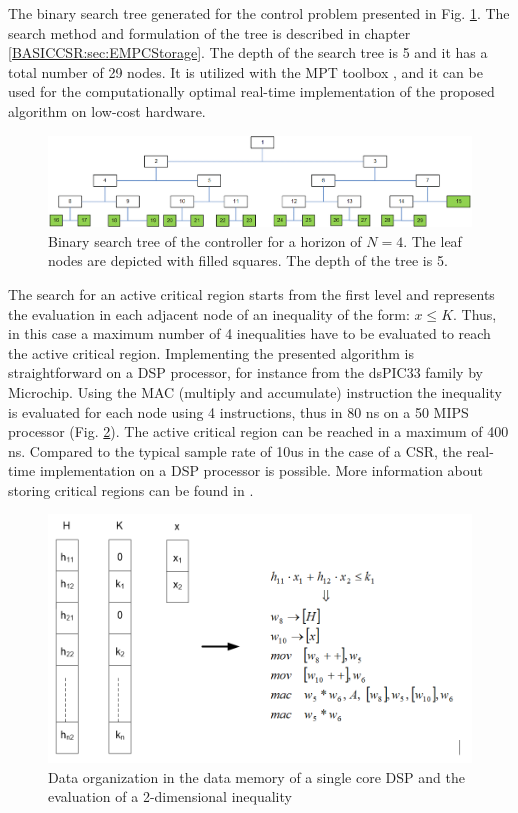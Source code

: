     The binary search tree generated for the control problem presented in Fig. \ref{EMPC:fig:SearchTree}. The search method and formulation of the tree is described in chapter \ref{BASICCSR:sec:EMPCStorage}. The depth of the search tree is 5 and it has a total number of 29 nodes. It is utilized with the MPT toolbox \cite{MPT3}, and it can be used for the computationally optimal real-time implementation of the proposed algorithm on low-cost hardware.

    \begin{figure}[!ht]
        \centering
        \includegraphics[width=\textwidth]{EMPC_PNG_Pics/SearchTree.png}
        \caption{Binary search tree of the controller for a horizon of $N = 4$. The leaf nodes are depicted with filled squares. The depth of the tree is 5.}
        \label{EMPC:fig:SearchTree}
    \end{figure}

    The search for an active critical region starts from the first level and represents the evaluation in each adjacent node of an inequality of the form: $x\leq K$. Thus, in this case a maximum number of 4 inequalities have to be evaluated to reach the active critical region. Implementing the presented algorithm is straightforward on a DSP processor, for instance from the dsPIC33 family by Microchip. Using the MAC (multiply and accumulate) instruction the inequality is evaluated for each node using 4 instructions, thus in 80 ns on a 50 MIPS processor (Fig. \ref{EMPC:fig:Memory}). The active critical region can be reached in a maximum of 400 ns. Compared to the typical sample rate of 10us in the case of a CSR, the real-time implementation on a DSP processor is possible. More information about storing critical regions can be found in .

    \begin{figure}[!ht]
        \centering
        \includegraphics[width=\textwidth]{EMPC_PNG_Pics/Memory.png}
        \caption{Data organization in the data memory of a single core DSP and the evaluation of a 2-dimensional inequality}
        \label{EMPC:fig:Memory}
    \end{figure}

